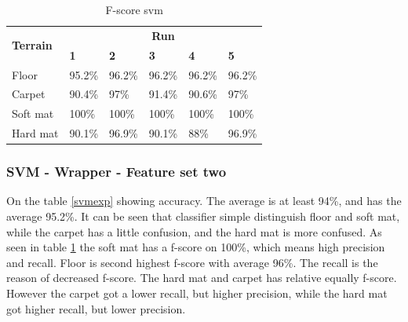 \documentclass[USenglish]{ifimaster}  %
\begin{document}
\begin{table}[h]
	\centering
	\begin{tabular}{@{}llllll@{}}
		\toprule
		\multirow{2}{*}{\textbf{Terrain}} & \multicolumn{5}{c}{\textbf{Run}} \\ \cmidrule(l){2-6} 
		& \multicolumn{1}{l|}{\textbf{1}} & \multicolumn{1}{l|}{\textbf{2}} & \multicolumn{1}{l|}{\textbf{3}} & \multicolumn{1}{l|}{\textbf{4}} & \textbf{5} \\ \midrule
		\multicolumn{1}{l|}{Floor} & \multicolumn{1}{l|}{95.2\%} & \multicolumn{1}{l|}{96.2\%} & \multicolumn{1}{l|}{96.2\%} & \multicolumn{1}{l|}{96.2\%} & 96.2\% \\ \midrule
		\multicolumn{1}{l|}{Carpet} & \multicolumn{1}{l|}{90.4\%} & \multicolumn{1}{l|}{97\%} & \multicolumn{1}{l|}{91.4\%} & \multicolumn{1}{l|}{90.6\%} & 97\% \\ \midrule
		\multicolumn{1}{l|}{Soft mat} & \multicolumn{1}{l|}{100\%} & \multicolumn{1}{l|}{100\%} & \multicolumn{1}{l|}{100\%} & \multicolumn{1}{l|}{100\%} & 100\% \\ \midrule
		\multicolumn{1}{l|}{Hard mat} & \multicolumn{1}{l|}{90.1\%} & \multicolumn{1}{l|}{96.9\%} & \multicolumn{1}{l|}{90.1\%} & \multicolumn{1}{l|}{88\%} & 96.9\% \\ \bottomrule
	\end{tabular}
	\caption{F-score svm}
	\label{fscoresvm}
\end{table}
\FloatBarrier
\subsubsection{SVM - Wrapper - Feature set two}
On the table \ref{svmexp} showing accuracy. The average is at least 94\%, and has the average 95.2\%. It can be seen that classifier simple distinguish floor and soft mat, while the carpet has a little confusion, and the hard mat is more confused. As seen in table \ref{fscoresvm} the soft mat has a f-score on 100\%, which means high precision and recall. Floor is second highest f-score with average 96\%. The recall is the reason of decreased f-score. The hard mat and carpet has relative equally f-score. However the carpet got a lower recall, but higher precision, while the hard mat got higher recall, but lower precision. 
\end{document}
